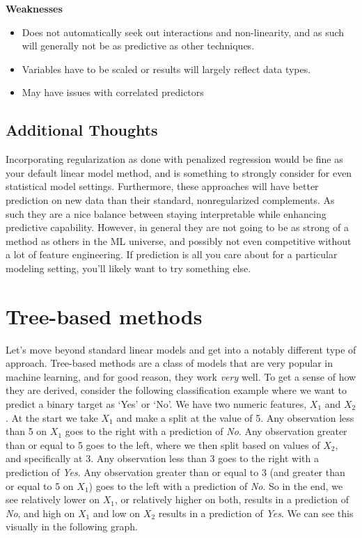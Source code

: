 \documentclass[
  letterpaper,
]{krantz}
\providecommand{\tightlist}{%
  \setlength{\itemsep}{0pt}\setlength{\parskip}{0pt}}\usepackage{longtable,booktabs,array}
\begin{document}
\textbf{Weaknesses}

\begin{itemize}
\tightlist
\item
  Does not automatically seek out interactions and non-linearity, and as
  such will generally not be as predictive as other techniques.
\item
  Variables have to be scaled or results will largely reflect data
  types.
\item
  May have issues with correlated predictors
\end{itemize}

\subsection{Additional Thoughts}\label{additional-thoughts-1}

Incorporating regularization as done with penalized regression would be
fine as your default linear model method, and is something to strongly
consider for even statistical model settings. Furthermore, these
approaches will have better prediction on new data than their standard,
nonregularized complements. As such they are a nice balance between
staying interpretable while enhancing predictive capability. However, in
general they are not going to be as strong of a method as others in the
ML universe, and possibly not even competitive without a lot of feature
engineering. If prediction is all you care about for a particular
modeling setting, you'll likely want to try something else.

\section{Tree-based methods}\label{tree-based-methods}

Let's move beyond standard linear models and get into a notably
different type of approach. Tree-based methods are a class of models
that are very popular in machine learning, and for good reason, they
work \emph{very} well. To get a sense of how they are derived, consider
the following classification example where we want to predict a binary
target as `Yes' or `No'. We have two numeric features, \(X_1\) and
\(X_2\). At the start we take \(X_1\) and make a split at the value of
5. Any observation less than 5 on \(X_1\) goes to the right with a
prediction of \emph{No}. Any observation greater than or equal to 5 goes
to the left, where we then split based on values of \(X_2\), and
specifically at 3. Any observation less than 3 goes to the right with a
prediction of \emph{Yes}. Any observation greater than or equal to 3
(and greater than or equal to 5 on \(X_1\)) goes to the left with a
prediction of \emph{No}. So in the end, we see relatively lower on
\(X_1\), or relatively higher on both, results in a prediction of
\emph{No}, and high on \(X_1\) and low on \(X_2\) results in a
prediction of \emph{Yes}. We can see this visually in the following
graph.
\end{document}
